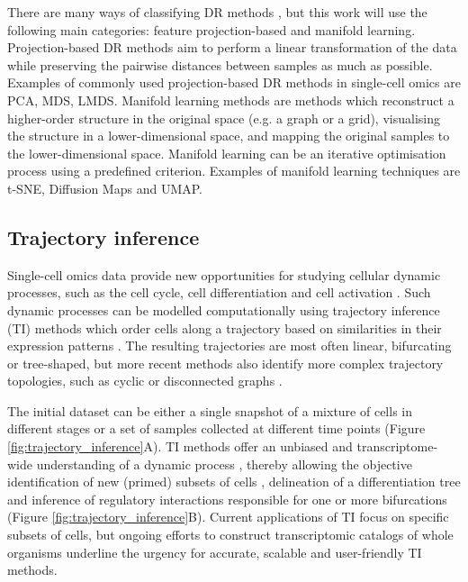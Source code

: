 There are many ways of classifying DR methods \cite{engel_surveydimensionreduction_2012}, but this work will use the following main categories: feature projection-based and manifold learning. 
Projection-based DR methods aim to perform a linear transformation of the data while preserving the pairwise distances between samples as much as possible. Examples of commonly used projection-based DR methods in single-cell omics are PCA, MDS, LMDS. 
Manifold learning methods are methods which reconstruct a higher-order structure in the original space (e.g. a graph or a grid), visualising the structure in a lower-dimensional space, and mapping the original samples to the lower-dimensional space. Manifold learning can be an iterative optimisation process using a predefined criterion. Examples of manifold learning techniques are t-SNE, Diffusion Maps and UMAP. 

\subsection{Trajectory inference}
Single-cell omics data provide new opportunities for studying cellular dynamic processes, such as the cell cycle, cell differentiation and cell activation \cite{tanay_scalingsinglecellgenomics_2017,etzrodt_quantitativesinglecellapproaches_2014}. Such dynamic processes can be modelled computationally using trajectory inference (TI) methods which order cells along a trajectory based on similarities in their expression patterns \cite{trapnell_definingcelltypes_2015,cannoodt_computationalmethodstrajectory_2016,moon_manifoldlearningbasedmethods_2018}. The resulting trajectories are most often linear, bifurcating or tree-shaped, but more recent methods also identify more complex trajectory topologies, such as cyclic \cite{liu_reconstructingcellcycle_2017} or disconnected graphs \cite{wolf_graphabstractionreconciles_2017}. 

The initial dataset can be either a single snapshot of a mixture of cells in different stages or a set of samples collected at different time points (Figure \ref{fig:trajectory_inference}A). 
TI methods offer an unbiased and transcriptome-wide understanding of a dynamic process \cite{tanay_scalingsinglecellgenomics_2017}, thereby allowing the objective identification of new (primed) subsets of cells \cite{schlitzer_identificationcdc1cdc2committed_2015}, delineation of a differentiation tree \cite{velten_humanhaematopoieticstem_2017,see_mappinghumandc_2017} and inference of regulatory interactions responsible for one or more bifurcations \cite{aibar_scenicsinglecellregulatory_2017} (Figure \ref{fig:trajectory_inference}B). Current applications of TI focus on specific subsets of cells, but ongoing efforts to construct transcriptomic catalogs of whole organisms \cite{regev_humancellatlas_2017,han_mappingmousecell_2018,schaum_singlecelltranscriptomics20_2018} underline the urgency for accurate, scalable \cite{aibar_scenicsinglecellregulatory_2017,angerer_singlecellsmake_2017} and user-friendly TI methods.


